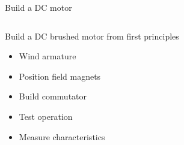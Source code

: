\documentclass[compress]{beamer}
\begin{document}
\begin{frame}{Build a DC motor}
    \begin{columns}
        \begin{column}{0.45\linewidth}
            Build a DC brushed motor from first principles
            \begin{itemize}

                \item Wind armature

                \item Position field magnets

                \item Build commutator

                \item Test operation

                \item Measure characteristics

            \end{itemize}

        \end{column}
        \begin{column}{0.45\linewidth}


\end{column}
\end{columns}
\end{frame}
\end{document}
